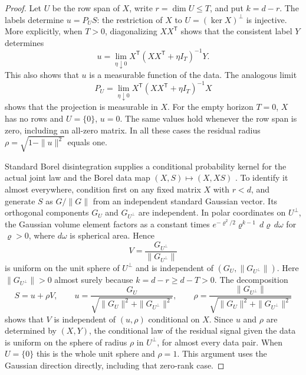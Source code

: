 \begin{proof}
Let $U$ be the row span of $X$, write $r=\dim U\le T$, and put
$k=d-r$. The labels determine $u=P_US$: the restriction of $X$ to
$U=(\ker X)^\perp$ is injective. More explicitly, when $T>0$,
diagonalizing $XX^{\mathsf T}$ shows that the consistent label $Y$
determines
\[
 u=\lim_{\eta\downarrow0}
 X^{\mathsf T}(XX^{\mathsf T}+\eta I_T)^{-1}Y.
\]
This also shows that $u$ is a measurable function of the data.
The analogous limit
\[
 P_U=\lim_{\eta\downarrow0}X^{\mathsf T}
 (XX^{\mathsf T}+\eta I_T)^{-1}X
\]
shows that the projection is measurable in $X$.
For the empty horizon $T=0$, $X$ has no rows and
$U=\{0\}$, $u=0$. The same values hold whenever the row span is
zero, including an all-zero matrix. In all these cases the residual
radius $\rho=\sqrt{1-\|u\|^2}$ equals one.

Standard Borel disintegration supplies a conditional probability
kernel for the actual joint law and the Borel data map
$(X,S)\mapsto(X,XS)$ \cite[Theorem~2.3]{GagnePanangaden2023}.
To identify it almost everywhere, condition first on any fixed matrix
$X$ with $r<d$, and generate $S$ as $G/\|G\|$ from an independent standard
Gaussian vector. Its orthogonal components $G_U$ and $G_{U^\perp}$
are independent. In polar coordinates on $U^\perp$, the Gaussian
volume element factors as a constant times
$e^{-\varrho^2/2}\varrho^{k-1}\,d\varrho\,d\omega$ for
$\varrho>0$, where $d\omega$ is spherical area. Hence
\[
 V=\frac{G_{U^\perp}}{\|G_{U^\perp}\|}
\]
is uniform on the unit sphere of $U^\perp$ and is independent of
$(G_U,\|G_{U^\perp}\|)$. Here $\|G_{U^\perp}\|>0$ almost surely
because $k=d-r\ge d-T>0$. The decomposition
\[
 S=u+\rho V,\qquad
 u=\frac{G_U}{\sqrt{\|G_U\|^2+\|G_{U^\perp}\|^2}},
 \qquad
 \rho=\frac{\|G_{U^\perp}\|}
 {\sqrt{\|G_U\|^2+\|G_{U^\perp}\|^2}}
\]
shows that $V$ is independent of $(u,\rho)$ conditional on $X$.
Since $u$ and $\rho$ are determined by $(X,Y)$, the conditional
law of the residual signal given the data is uniform on the sphere
of radius $\rho$ in $U^\perp$, for almost every data pair. When
$U=\{0\}$ this is the whole unit sphere and $\rho=1$. This argument
uses the Gaussian direction directly, including that zero-rank
case.


\end{proof}
